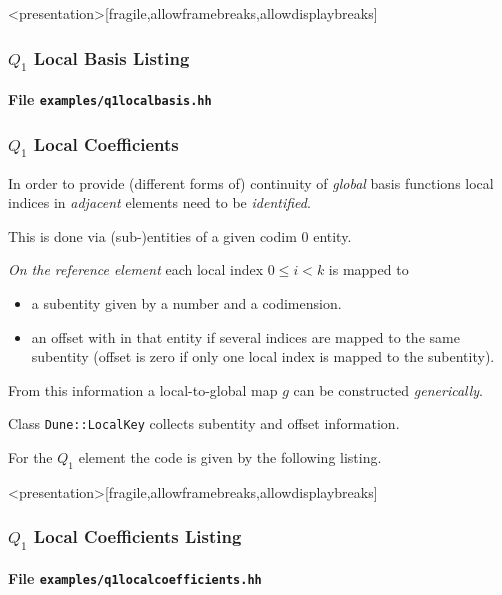 \begin{frame}<presentation>[fragile,allowframebreaks,allowdisplaybreaks]
\frametitle<presentation>{$Q_1$ Local Basis Listing}
\framesubtitle<presentation>{File \texttt{examples/q1localbasis.hh}}

\end{frame}


\begin{frame}
\frametitle<presentation>{$Q_1$ Local Coefficients}
In order to provide (different forms of) continuity of \textit{global} basis
functions local indices in \textit{adjacent} elements need to be \textit{identified}.

This is done via (sub-)entities of a given codim 0 entity.

\textit{On the reference element} each local index $0\leq i < k$ is
mapped to
\begin{itemize}
\item a subentity given by a number and a codimension.
\item an offset with in that entity if several indices are mapped to
the same subentity (offset is zero if only one local index is mapped
to the subentity). 
\end{itemize} 

From this information a local-to-global map $g$ can be
constructed \textit{generically}. 

Class \lstinline{Dune::LocalKey} collects subentity and offset information.

For the $Q_1$ element the code is given by the following listing.
\end{frame}

\begin{frame}<presentation>[fragile,allowframebreaks,allowdisplaybreaks]
\frametitle<presentation>{$Q_1$ Local Coefficients Listing}
\framesubtitle<presentation>{File \texttt{examples/q1localcoefficients.hh}}

\end{frame}


